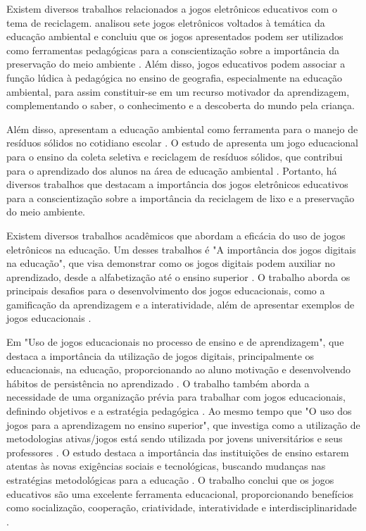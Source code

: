 Existem diversos trabalhos relacionados a jogos eletrônicos educativos com o tema de reciclagem. \cite{santos2012} analisou sete jogos eletrônicos voltados à temática da educação ambiental e concluiu que os jogos apresentados podem ser utilizados como ferramentas pedagógicas para a conscientização sobre a importância da preservação do meio ambiente \cite{santos2012}. Além disso, jogos educativos podem associar a função lúdica à pedagógica no ensino de geografia, especialmente na educação ambiental, para assim constituir-se em um recurso motivador da aprendizagem, complementando o saber, o conhecimento e a descoberta do mundo pela criança.

Além disso, \cite{souza2016} apresentam a educação ambiental como ferramenta para o manejo de resíduos sólidos no cotidiano escolar \cite{souza2016}. O estudo de \cite{goletando2018} apresenta um jogo educacional para o ensino da coleta seletiva e reciclagem de resíduos sólidos, que contribui para o aprendizado dos alunos na área de educação ambiental \cite{goletando2018}.
Portanto, há diversos trabalhos que destacam a importância dos jogos eletrônicos educativos para a conscientização sobre a importância da reciclagem de lixo e a preservação do meio ambiente.

Existem diversos trabalhos acadêmicos que abordam a eficácia do uso de jogos eletrônicos na educação. Um desses trabalhos é "A importância dos jogos digitais na educação", que visa demonstrar como os jogos digitais podem auxiliar no aprendizado, desde a alfabetização até o ensino superior \cite{importancia-jogos-digitais}. O trabalho aborda os principais desafios para o desenvolvimento dos jogos educacionais, como a gamificação da aprendizagem e a interatividade, além de apresentar exemplos de jogos educacionais \cite{importancia-jogos-digitais}.

Em "Uso de jogos educacionais no processo de ensino e de aprendizagem", que destaca a importância da utilização de jogos digitais, principalmente os educacionais, na educação, proporcionando ao aluno motivação e desenvolvendo hábitos de persistência no aprendizado \cite{uso-jogos-educacionais}. O trabalho também aborda a necessidade de uma organização prévia para trabalhar com jogos educacionais, definindo objetivos e a estratégia pedagógica \cite{uso-jogos-educacionais}. Ao mesmo tempo que "O uso dos jogos para a aprendizagem no ensino superior", que investiga como a utilização de metodologias ativas/jogos está sendo utilizada por jovens universitários e seus professores \cite{uso-jogos-aprendizagem}. O estudo destaca a importância das instituições de ensino estarem atentas às novas exigências sociais e tecnológicas, buscando mudanças nas estratégias metodológicas para a educação \cite{uso-jogos-aprendizagem}. O trabalho conclui que os jogos educativos são uma excelente ferramenta educacional, proporcionando benefícios como socialização, cooperação, criatividade, interatividade e interdisciplinaridade \cite{uso-jogos-aprendizagem}.

